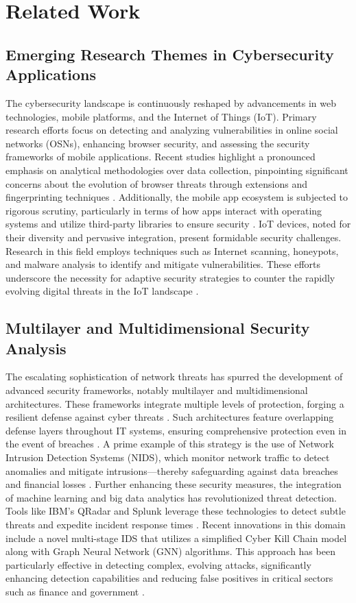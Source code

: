 \section{Related Work}

\subsection{Emerging Research Themes in Cybersecurity Applications}
The cybersecurity landscape is continuously reshaped by advancements in web technologies, mobile platforms, and the Internet of Things (IoT). Primary research efforts focus on detecting and analyzing vulnerabilities in online social networks (OSNs), enhancing browser security, and assessing the security frameworks of mobile applications. Recent studies highlight a pronounced emphasis on analytical methodologies over data collection, pinpointing significant concerns about the evolution of browser threats through extensions and fingerprinting techniques \cite{7}. Additionally, the mobile app ecosystem is subjected to rigorous scrutiny, particularly in terms of how apps interact with operating systems and utilize third-party libraries to ensure security \cite{7}.
IoT devices, noted for their diversity and pervasive integration, present formidable security challenges. Research in this field employs techniques such as Internet scanning, honeypots, and malware analysis to identify and mitigate vulnerabilities. These efforts underscore the necessity for adaptive security strategies to counter the rapidly evolving digital threats in the IoT landscape \cite{7}.

\subsection{Multilayer and Multidimensional Security Analysis}
The escalating sophistication of network threats has spurred the development of advanced security frameworks, notably multilayer and multidimensional architectures. These frameworks integrate multiple levels of protection, forging a resilient defense against cyber threats \cite{1}. Such architectures feature overlapping defense layers throughout IT systems, ensuring comprehensive protection even in the event of breaches \cite{2}. A prime example of this strategy is the use of Network Intrusion Detection Systems (NIDS), which monitor network traffic to detect anomalies and mitigate intrusions—thereby safeguarding against data breaches and financial losses \cite{3}.
Further enhancing these security measures, the integration of machine learning and big data analytics has revolutionized threat detection. Tools like IBM’s QRadar and Splunk leverage these technologies to detect subtle threats and expedite incident response times \cite{4}. Recent innovations in this domain include a novel multi-stage IDS that utilizes a simplified Cyber Kill Chain model along with Graph Neural Network (GNN) algorithms. This approach has been particularly effective in detecting complex, evolving attacks, significantly enhancing detection capabilities and reducing false positives in critical sectors such as finance and government \cite{5, 6}.

